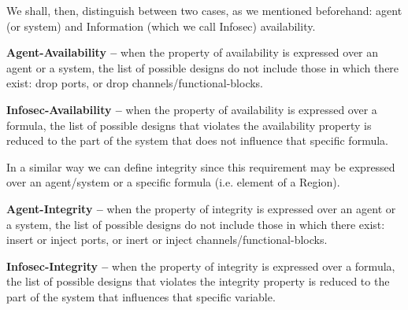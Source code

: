 We shall, then, distinguish between two cases, as we mentioned beforehand:
agent (or system) and Information (which we call Infosec) availability. 
\begin{definition}{\bf Agent-Availability --}\label{def:agent-a}
when the property of availability is expressed over an agent or a system, the
	list of possible designs do not include those in which there exist:
	drop ports, or drop channels/functional-blocks.
\end{definition}
\begin{definition}{\bf Infosec-Availability --}\label{def:infosec-c}
when the property of availability is expressed
	over a formula, the list of possible designs that violates the
	availability property is reduced to the part of the system that
	does not influence that specific formula.
\end{definition}

In a similar way we can define integrity since this requirement may 
be expressed over an agent/system or a specific formula (i.e. element of a Region).

\begin{definition}{\bf Agent-Integrity --}\label{def:agent-a}
when the property of integrity is expressed over
	an agent or a system, the list of possible designs 
	do not include those in which there exist: insert or inject ports, 
	or inert or inject channels/functional-blocks. 
\end{definition}
\begin{definition}{\bf Infosec-Integrity --}\label{def:infosec-c}
when the property of integrity is expressed
	over a formula, the list of possible designs that violates the
	integrity property is reduced to the part of the system that
	influences that specific variable.
\end{definition}

